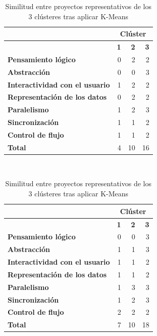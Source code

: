 \documentclass[a4paper, 12pt]{book}
\begin{document}
\begin{table}[H]
    \begin{subtable}[h]{0.49\textwidth}
        \centering
        \begin{tabular}{lrrr}
            {} & \multicolumn{3}{c}{\cellcolor[HTML]{FFCCC9}\textbf{Clúster}} \\ 
            \hline
            {} & \textbf{1} & \textbf{2} & \textbf{3} \\ 
            \hline
            \textbf{Pensamiento lógico} & 0 & 2 & 2 \\
            \textbf{Abstracción} & 0 & 0 & 3 \\
            \textbf{Interactividad con el usuario} & 1 & 2 & 2 \\
            \textbf{Representación de los datos} & 0 & 2 & 2 \\
            \textbf{Paralelismo} & 1 & 2 & 3 \\
            \textbf{Sincronización} & 1 & 1 & 2 \\
            \textbf{Control de flujo} & 1 & 1 & 2 \\ 
            \hline
            \textbf{Total} & 4 & 10 & 16 \\ 
            \hline
        \end{tabular}
        \caption{Dataset de 269.842 proyectos}
        \label{table:prototype_269.842}
    \end{subtable}
    ~
    \begin{subtable}[h]{0.49\textwidth}
        \centering
        \begin{tabular}{lrrr}
        {\color[HTML]{000000} {}} & \multicolumn{3}{c}{\cellcolor[HTML]{CBCEFB}\textbf{Clúster}} \\ 
            \hline
            {} & \textbf{1} & \textbf{2} & \textbf{3} \\ \hline
            \textbf{Pensamiento lógico} & 0 & 0 & 3 \\
            \textbf{Abstracción} & 1 & 1 & 3 \\
            \textbf{Interactividad con el usuario} & 1 & 1 & 2 \\
            \textbf{Representación de los datos} & 1 & 1 & 2 \\
            \textbf{Paralelismo} & 1 & 3 & 3 \\
            \textbf{Sincronización} & 1 & 2 & 3 \\
            \textbf{Control de flujo} & 2 & 2 & 2 \\ 
            \hline
            \textbf{Total} & 7 & 10 & 18 \\ 
            \hline
        \end{tabular}
        \caption{Muestra de 250 proyectos}
        \label{table:prototype_250}
    \end{subtable}
    \caption{Similitud entre proyectos representativos de los 3 clústeres tras aplicar K-Means}
\end{table}
\end{document}
